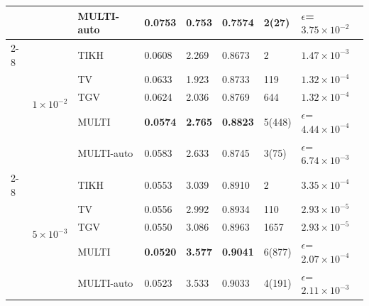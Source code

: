 \begin{tabular}{llllllll}
 &  & MULTI-auto & 0.0753 & 0.753 & 0.7574 & 2(27) & $\epsilon$=$3.75\times 10^{-2}$ \\
\cmidrule{2-8}
 & \multirow{5}{*}{$1\times 10^{-2}$} & TIKH & 0.0608 & 2.269 & 0.8673 & 2 & $1.47\times 10^{-3}$ \\
 &  & TV & 0.0633 & 1.923 & 0.8733 & 119 & $1.32\times 10^{-4}$ \\
 &  & TGV & 0.0624 & 2.036 & 0.8769 & 644 & $1.32\times 10^{-4}$ \\
 &  & MULTI & \textbf{0.0574} & \textbf{2.765} & \textbf{0.8823} & 5(448) & $\epsilon$=$4.44\times 10^{-4}$ \\
 &  & MULTI-auto & 0.0583 & 2.633 & 0.8745 & 3(75) & $\epsilon$=$6.74\times 10^{-3}$ \\
\cmidrule{2-8}
 & \multirow{5}{*}{$5\times 10^{-3}$} & TIKH & 0.0553 & 3.039 & 0.8910 & 2 & $3.35\times 10^{-4}$ \\
 &  & TV & 0.0556 & 2.992 & 0.8934 & 110 & $2.93\times 10^{-5}$ \\
 &  & TGV & 0.0550 & 3.086 & 0.8963 & 1657 & $2.93\times 10^{-5}$ \\
 &  & MULTI & \textbf{0.0520} & \textbf{3.577} & \textbf{0.9041} & 6(877) & $\epsilon$=$2.07\times 10^{-4}$ \\
 &  & MULTI-auto & 0.0523 & 3.533 & 0.9033 & 4(191) & $\epsilon$=$2.11\times 10^{-3}$ \\
\bottomrule
\end{tabular}